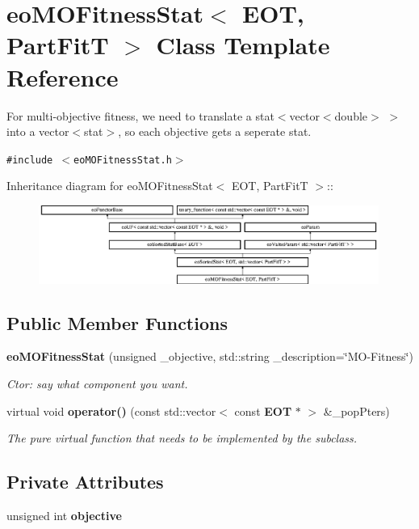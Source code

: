 \section{eo\-MOFitness\-Stat$<$ EOT, Part\-Fit\-T $>$ Class Template Reference}
\label{classeo_m_o_fitness_stat}
For multi-objective fitness, we need to translate a stat$<$vector$<$double$>$ $>$ into a vector$<$stat$>$, so each objective gets a seperate stat.  


{\tt \#include $<$eo\-MOFitness\-Stat.h$>$}

Inheritance diagram for eo\-MOFitness\-Stat$<$ EOT, Part\-Fit\-T $>$::\begin{figure}[H]
\begin{center}
\leavevmode
\includegraphics[height=2.55708cm]{classeo_m_o_fitness_stat}
\end{center}
\end{figure}
\subsection*{Public Member Functions}
\begin{CompactItemize}
\item 
{\bf eo\-MOFitness\-Stat} (unsigned \_\-objective, std::string \_\-description=\char`\"{}MO-Fitness\char`\"{})\label{classeo_m_o_fitness_stat_a0}

\begin{CompactList}\small\item\em Ctor: say what component you want. \item\end{CompactList}\item 
virtual void {\bf operator()} (const std::vector$<$ const {\bf EOT} $\ast$ $>$ \&\_\-pop\-Pters)\label{classeo_m_o_fitness_stat_a1}

\begin{CompactList}\small\item\em The pure virtual function that needs to be implemented by the subclass. \item\end{CompactList}\end{CompactItemize}
\subsection*{Private Attributes}
\begin{CompactItemize}
\item 
unsigned int {\bf objective}\label{classeo_m_o_fitness_stat_r0}

\end{CompactItemize}


